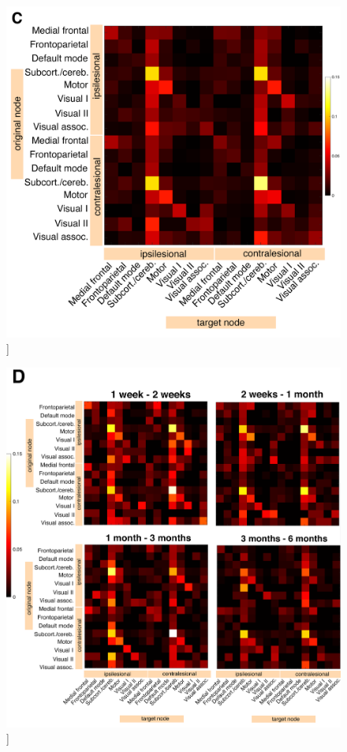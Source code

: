 \documentclass[phd,tocprelim]{cornell}
\renewcommand{\caption}[1]{\singlespacing\hangcaption{#1}\normalspacing}
\begin{document}
\begin{figure}[h!]
		\ContinuedFloat
		\captionsetup{labelformat=adja-page}
    \centering
    \includegraphics[width=\textwidth]{chapter1/SupplementaryFigure16C.png}
    \caption[]{}
\end{figure}
\null
\vfill
\clearpage
\null
\vfill
\begin{figure}[h!]
		\ContinuedFloat
		\captionsetup{labelformat=adja-page}
    \centering
    \includegraphics[width=\textwidth]{chapter1/SupplementaryFigure16D.png}
    \caption[]{}
\end{figure}
\null
\vfill
\clearpage
\null
\vfill
\end{document}
